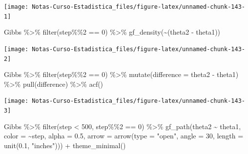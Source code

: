 \documentclass[
  12pt,
]{book}
\newenvironment{Shaded}{\begin{snugshade}}{\end{snugshade}}
\newcommand{\AttributeTok}[1]{\textcolor[rgb]{0.77,0.63,0.00}{#1}}
\newcommand{\DecValTok}[1]{\textcolor[rgb]{0.00,0.00,0.81}{#1}}
\newcommand{\FloatTok}[1]{\textcolor[rgb]{0.00,0.00,0.81}{#1}}
\newcommand{\FunctionTok}[1]{\textcolor[rgb]{0.00,0.00,0.00}{#1}}
\newcommand{\NormalTok}[1]{#1}
\newcommand{\SpecialCharTok}[1]{\textcolor[rgb]{0.00,0.00,0.00}{#1}}
\newcommand{\StringTok}[1]{\textcolor[rgb]{0.31,0.60,0.02}{#1}}
\theoremstyle{definition}
\theoremstyle{definition}
\theoremstyle{definition}
\theoremstyle{remark}
\begin{document}
\begin{center}\texttt{[image: Notas-Curso-Estadistica\_files/figure-latex/unnamed-chunk-143-1]} \end{center}

\begin{Shaded}
\begin{Highlighting}[]
\NormalTok{Gibbs }\SpecialCharTok{\%\textgreater{}\%} \FunctionTok{filter}\NormalTok{(step}\SpecialCharTok{\%\%}\DecValTok{2} \SpecialCharTok{==} \DecValTok{0}\NormalTok{) }\SpecialCharTok{\%\textgreater{}\%} \FunctionTok{gf\_density}\NormalTok{(}\SpecialCharTok{\textasciitilde{}}\NormalTok{(theta2 }\SpecialCharTok{{-}} 
\NormalTok{    theta1))}
\end{Highlighting}
\end{Shaded}

\begin{center}\texttt{[image: Notas-Curso-Estadistica\_files/figure-latex/unnamed-chunk-143-2]} \end{center}

\begin{Shaded}
\begin{Highlighting}[]
\NormalTok{Gibbs }\SpecialCharTok{\%\textgreater{}\%} \FunctionTok{filter}\NormalTok{(step}\SpecialCharTok{\%\%}\DecValTok{2} \SpecialCharTok{==} \DecValTok{0}\NormalTok{) }\SpecialCharTok{\%\textgreater{}\%} \FunctionTok{mutate}\NormalTok{(}\AttributeTok{difference =}\NormalTok{ theta2 }\SpecialCharTok{{-}} 
\NormalTok{    theta1) }\SpecialCharTok{\%\textgreater{}\%} \FunctionTok{pull}\NormalTok{(difference) }\SpecialCharTok{\%\textgreater{}\%} \FunctionTok{acf}\NormalTok{()}
\end{Highlighting}
\end{Shaded}

\begin{center}\texttt{[image: Notas-Curso-Estadistica\_files/figure-latex/unnamed-chunk-143-3]} \end{center}

\begin{Shaded}
\begin{Highlighting}[]
\NormalTok{Gibbs }\SpecialCharTok{\%\textgreater{}\%} \FunctionTok{filter}\NormalTok{(step }\SpecialCharTok{\textless{}} \DecValTok{500}\NormalTok{, step}\SpecialCharTok{\%\%}\DecValTok{2} \SpecialCharTok{==} \DecValTok{0}\NormalTok{) }\SpecialCharTok{\%\textgreater{}\%} \FunctionTok{gf\_path}\NormalTok{(theta2 }\SpecialCharTok{\textasciitilde{}} 
\NormalTok{    theta1, }\AttributeTok{color =} \SpecialCharTok{\textasciitilde{}}\NormalTok{step, }\AttributeTok{alpha =} \FloatTok{0.5}\NormalTok{, }\AttributeTok{arrow =} \FunctionTok{arrow}\NormalTok{(}\AttributeTok{type =} \StringTok{"open"}\NormalTok{, }
    \AttributeTok{angle =} \DecValTok{30}\NormalTok{, }\AttributeTok{length =} \FunctionTok{unit}\NormalTok{(}\FloatTok{0.1}\NormalTok{, }\StringTok{"inches"}\NormalTok{))) }\SpecialCharTok{+} \FunctionTok{theme\_minimal}\NormalTok{()}
\end{Highlighting}
\end{Shaded}
\end{document}
